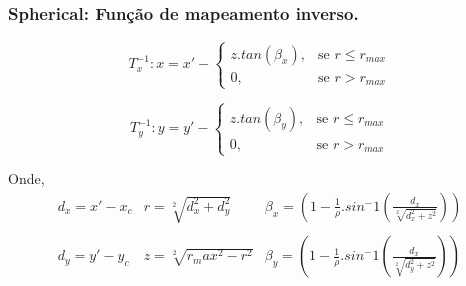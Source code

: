 \documentclass{beamer}
\begin{document}
\begin{frame}
 \frametitle{Spherical: Função de mapeamento inverso.}
  \begin{equation}
    T_x^{-1}: x = x' -
\begin{cases}
 z.tan(\beta_x), & \text{se } r \leq r_{max}\\
 0, & \text{se } r > r_{max}
\end{cases}
   \end{equation}

\begin{equation}
    T_y^{-1}: y = y' - 
\begin{cases}
 z.tan(\beta_y), & \text{se } r \leq r_{max} \\
 0, & \text{se } r > r_{max}
\end{cases}
\end{equation}

Onde,
\begin{equation}
\begin{array}{c|c|c}
d_x = x'- x_c & r = \sqrt[2]{d_x^2+d_y^2}  & \beta_x =
(1-\frac{1}{\rho}.sin^-1(\frac{d_x}{\sqrt[2]{d_x^2+z^2}}))\\
 & & \\
d_y =  y'- y_c & z = \sqrt[2]{r_max^2 - r^2} & \beta_y = 
(1-\frac{1}{\rho}.sin^-1(\frac{d_x}{\sqrt[2]{d_y^2+z^2}}))
\end{array}
\end{equation}
\end{frame}

\end{document}
